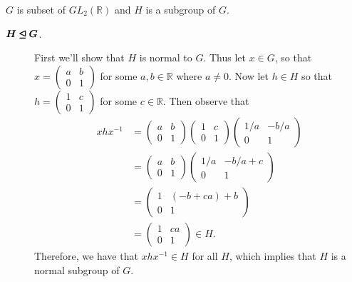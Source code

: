     $G$ is subset of $GL_2(\mathbb{R})$ and $H$ is a subgroup of $G$.
    \begin{description}
        \item[$\bm{H \unlhd G}$.] First we'll show that $H$ is normal
        to $G$. Thus let $x \in G$, so that 
        $
            x =         \begin{pmatrix}
                a & b \\
                0 & 1    
            \end{pmatrix}
        $
        for some $a, b \in \mathbb{R}$ where $a \ne 0$. Now let $h \in
        H$ so that 
        $
            h = \begin{pmatrix}
                1 & c \\
                0 & 1    
            \end{pmatrix}
        $
        for some $c \in \mathbb{R}$. Then observe that 
        \begin{align*}
            xhx^{-1} &= 
            \begin{pmatrix}
                a & b \\
                0 & 1    
            \end{pmatrix}
            \begin{pmatrix}
                1 & c \\
                0 & 1    
            \end{pmatrix}
            \begin{pmatrix}
                1/a & -b/a \\
                0 & 1    
            \end{pmatrix}\\
            &= \begin{pmatrix}
                a & b \\
                0 & 1    
            \end{pmatrix}
            \begin{pmatrix}
                1/a & -b/a + c \\
                0 & 1    
            \end{pmatrix}\\
            &=
            \begin{pmatrix}
                1 & (-b + ca) + b \\
                0 & 1    
            \end{pmatrix}\\
            &= \begin{pmatrix}
                1 & ca \\
                0 & 1    
            \end{pmatrix} \in H.
        \end{align*}
    Therefore, we have that $xhx^{-1} \in H$ for all $H$, which
    implies that $H$ is a normal subgroup of $G$. 


\end{description}
